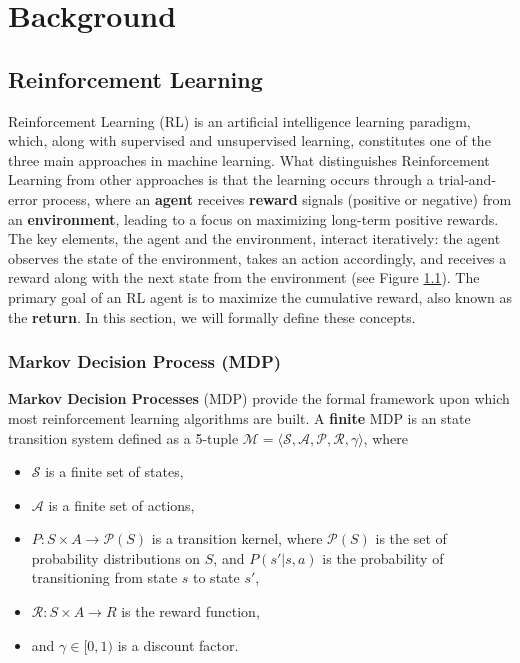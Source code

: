 
\chapter{Background}

\section{Reinforcement Learning}

Reinforcement Learning (RL) \cite{sutton2018reinforcement} is an artificial intelligence learning paradigm, which, along with supervised and unsupervised learning, constitutes one of the three main approaches in machine learning. What distinguishes Reinforcement Learning from other approaches is that the learning occurs through a trial-and-error process, where an \textbf{agent} receives \textbf{reward} signals (positive or negative) from an \textbf{environment}, leading to a focus on maximizing long-term positive rewards. The key elements, the agent and the environment, interact iteratively: the agent observes the state of the environment, takes an action accordingly, and receives a reward along with the next state from the environment (see Figure \ref{}). The primary goal of an RL agent is to maximize the cumulative reward, also known as the \textbf{return}. In this section, we will formally define these concepts.

\subsection{Markov Decision Process (MDP)}
\label{sec:mdp_definition}

\textbf{Markov Decision Processes} (MDP) provide the formal framework upon which most reinforcement learning algorithms are built. A \textbf{finite} MDP is an state transition system defined as a 5-tuple $\mathcal{M} = \langle \mathcal{S}, \mathcal{A}, \mathcal{P}, \mathcal{R}, \gamma \rangle$, where 

\begin{itemize}
    \item $\mathcal{S}$ is a finite set of states,
    \item $\mathcal{A}$ is a finite set of actions,
    \item $P : S \times A \rightarrow \mathcal{P}(S)$ is a transition kernel, where $\mathcal{P}(S)$ is the set of probability distributions on $S$, and $P(s'|s, a)$ is the probability of transitioning from state $s$ to state $s'$,
    \item $\mathcal{R} : S \times A \rightarrow R$ is the reward function,
    \item and $\gamma \in [0, 1)$ is a discount factor.
\end{itemize}

